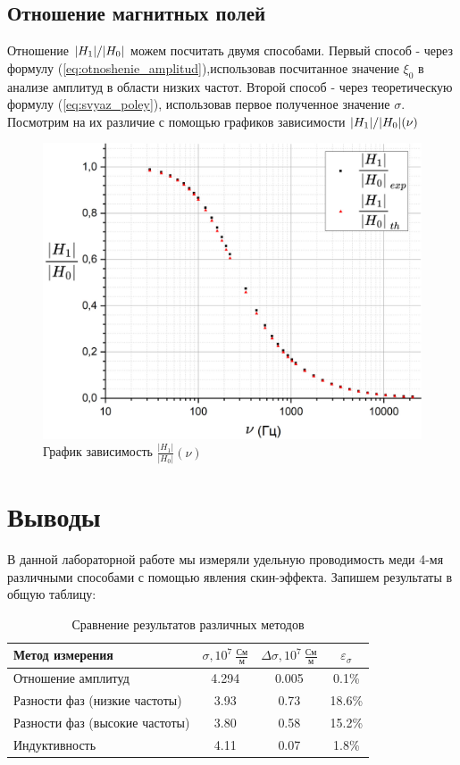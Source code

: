 \documentclass{article}
\begin{document}
	
	\subsection*{Отношение магнитных полей}
	Отношение $\abs{H_1}/\abs{H_0}$ можем посчитать двумя способами. Первый способ - через
	формулу (\ref{eq:otnoshenie_amplitud}),использовав посчитанное значение $\xi_0$ в анализе амплитуд в области низких частот.
	Второй способ - через теоретическую формулу (\ref{eq:svyaz_poley}), использовав первое полученное значение $\sigma$. Посмотрим на их различие с помощью графиков зависимости
	$\abs{H_1}/\abs{H_0} (\nu)$
	
	\begin{figure}[h]
		\centering
		\includegraphics[width=\textwidth]{15_13_33.png}
		\caption{График зависимость $\frac{|H_1|}{|H_0|}(\nu)$}
	\end{figure}
	
	\section*{Выводы}
	В данной лабораторной работе мы измеряли удельную проводимость меди 4-мя различными способами с помощью явления скин-эффекта. Запишем результаты в общую таблицу:
	
	\begin{table}[!h]
		\begin{center}
			\begin{tabular}{|l|c|c|c|}
				\hline
				Метод измерения & $\sigma, 10^{7} \ \frac{\text{См}}{\text{м}}$ & $\Delta\sigma, 10^{7} \ \frac{\text{См}}{\text{м}}$ & $\varepsilon_{\sigma}$\\
				\hline
				Отношение амплитуд & 4.294 & 0.005 & 0.1\%\\ \hline
				Разности фаз (низкие частоты) & 3.93 & 0.73 & 18.6\%\\ \hline
				Разности фаз (высокие частоты) & 3.80 & 0.58 & 15.2\%\\ \hline
				Индуктивность & 4.11 & 0.07 & 1.8\%\\ \hline
				
			\end{tabular}
		\end{center}
		\caption{Сравнение результатов различных методов}\label{}
	\end{table}
	
\end{document}
